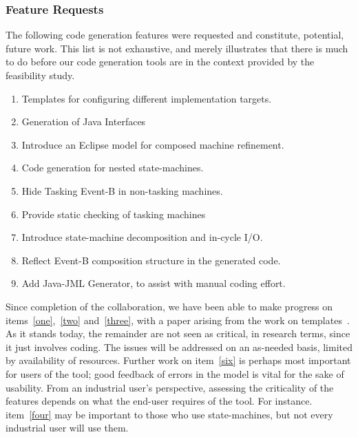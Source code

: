 \documentclass{llncs}%
\begin{document}
\subsubsection{Feature Requests}
The following code generation features were requested and constitute, potential, future work. This list is not exhaustive, and merely illustrates that there is much to do before our code generation tools are in the context provided by the feasibility study.
%
\begin{enumerate}[noitemsep]
\item\label{one} Templates for configuring different implementation targets.
\item\label{two} Generation of Java Interfaces
\item\label{three} Introduce an Eclipse model for composed machine refinement.
\item\label{four} Code generation for nested state-machines.
\item Hide Tasking Event-B in non-tasking machines.
\item\label{six} Provide static checking of tasking machines
\item Introduce state-machine decomposition and in-cycle I/O.
\item Reflect Event-B composition structure in the generated code.
\item Add Java-JML Generator, to assist with manual coding effort.
\end{enumerate} 

Since completion of the collaboration, we have been able to make progress on items~\ref{one},~\ref{two} and~\ref{three}, with a paper arising from the work on templates~\cite{ae2014a}. As it stands today, the remainder are not seen as critical, in research terms, since it just involves coding. The issues will be addressed on an as-needed basis, limited by availability of resources. Further work on item~\ref{six} is perhaps most important for users of the tool; good feedback of errors in the model is vital for the sake of usability. From an industrial user's perspective, assessing the criticality of the features depends  on what the end-user requires of the tool. For instance. item~\ref{four} may be important to those who use state-machines, but not every industrial user will use them.     
%
\end{document}

